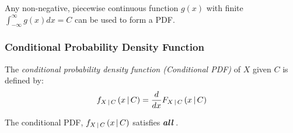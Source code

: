 			\begin{remark*}
				Any non-negative, piecewise continuous function $g \left( x \right)$ with finite $\int_{-\infty}^{\infty} g \left( x \right) dx = C$ can be used to form a PDF.
			\end{remark*}

		\subsubsection{Conditional Probability Density Function} \label{subsubsec:Conditional Probability Density Function}
			\begin{definition} \label{def:Conditional Probability Density Function}
				The \emph{conditional probability density function (Conditional PDF)} of $X$ given $C$ is defined by:
				\begin{equation} \label{eq:Conditional Probability Density Function}
					f_{X \operatorname{\vert} C} \left( x \operatorname{\vert} C \right) = \frac{d}{dx} F_{X \operatorname{\vert} C} \left( x \operatorname{\vert} C \right)
				\end{equation}
				\begin{remark}
					The conditional PDF, $f_{X \operatorname{\vert} C} \left( x \operatorname{\vert} C \right)$ satisfies \emph{\textbf{all}} .
				\end{remark}
			\end{definition}

